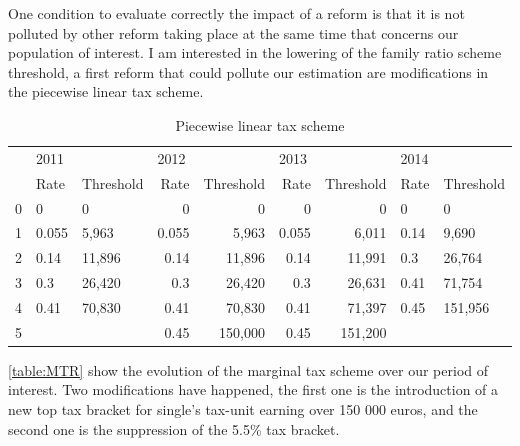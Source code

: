 One condition to evaluate correctly the impact of a reform is that it is not polluted by other reform taking place at the same time that concerns our population of interest. I am interested in the lowering of the family ratio scheme threshold, a first reform that could pollute our estimation are modifications in the piecewise linear tax scheme.

  \begin{table}[H]
  \center
  \caption{Piecewise linear tax scheme}
  \label{table:MTR}
  \begin{tabular}{lllrrrrll}
  \toprule
  {} & \multicolumn{2}{l}{2011} & \multicolumn{2}{l}{2012} & \multicolumn{2}{l}{2013} & \multicolumn{2}{l}{2014} \\
  {} &                 Rate &            Threshold &                 Rate &            Threshold &                 Rate &            Threshold &                 Rate &            Threshold \\
  \midrule
  0 &                    0 &                    0 &                    0 &                    0 &                    0 &                    0 &                    0 &                    0 \\
  1 &                0.055 &                5,963 &                0.055 &                5,963 &                0.055 &                6,011 &                 0.14 &                9,690 \\
  2 &                 0.14 &               11,896 &                 0.14 &               11,896 &                 0.14 &               11,991 &                  0.3 &               26,764 \\
  3 &                  0.3 &               26,420 &                  0.3 &               26,420 &                  0.3 &               26,631 &                 0.41 &               71,754 \\
  4 &                 0.41 &               70,830 &                 0.41 &               70,830 &                 0.41 &               71,397 &                 0.45 &              151,956 \\
  5 &                      &                      &                 0.45 &              150,000 &                 0.45 &              151,200 &                      &                      \\
  \bottomrule
  \end{tabular}

  \end{table}

\autoref{table:MTR} show the evolution of the marginal tax scheme over our period of interest. Two modifications have happened, the first one is the introduction of a new top tax bracket for single's tax-unit earning over 150 000 euros, and the second one is the suppression of the 5.5\% tax bracket.

